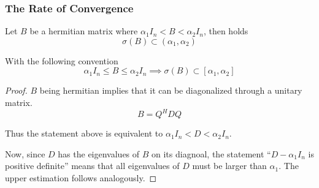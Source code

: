 \subsubsection{The Rate of Convergence}
\begin{lemma}\label{lem:spectr}
   Let \(B\) be a hermitian matrix where \(\alpha_1 I_n < B < \alpha_2 I_n\), then holds
   \[\sigma(B) \subset (\alpha_1, \alpha_2)\]
\end{lemma}
\begin{remark}
   With the following convention
   \[\alpha_1 I_n \leq B \leq \alpha_2 I_n \implies \sigma(B) \subset [\alpha_1, \alpha_2]\]
\end{remark}
\begin{proof}
   \(B\) being hermitian implies that it can be diagonalized through a unitary matrix.
   \[B = Q^HDQ\]

   Thus the statement above is equivalent to \(\alpha_1 I_n < D < \alpha_2 I_n\).

   Now, since \(D\) has the eigenvalues of \(B\) on its diagnoal, the statement ``\(D - \alpha_1 I_n\) is positive definite'' means that all eigenvalues of \(D\) must be larger than \(\alpha_1\).
   The upper estimation follows analogously.
\end{proof}

